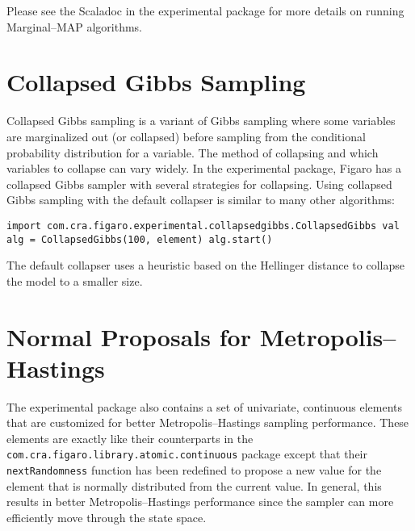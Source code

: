 Please see the Scaladoc in the experimental package for more details on running Marginal--MAP algorithms.

\section{Collapsed Gibbs Sampling}
Collapsed Gibbs sampling is a variant of Gibbs sampling where some variables are marginalized out (or collapsed) before sampling from the conditional probability distribution for a variable. The method of collapsing and which variables to collapse can vary widely. In the experimental package, Figaro has a collapsed Gibbs sampler with several strategies for collapsing. Using collapsed Gibbs sampling with the default collapser is similar to many other algorithms:
\begin{flushleft}
\texttt{import
\newline com.cra.figaro.experimental.collapsedgibbs.CollapsedGibbs
\newline
\newline val alg = CollapsedGibbs(100, element)
\newline alg.start()
}
\end{flushleft}
The default collapser uses a heuristic based on the Hellinger distance
to collapse the model to a smaller size.

\section{Normal Proposals for Metropolis--Hastings}
The experimental package also contains a set of univariate, continuous elements that are customized for better Metropolis--Hastings sampling performance. These elements are exactly like their counterparts in the \texttt{com.cra.figaro.library.atomic.continuous} package except that their \texttt{nextRandomness} function has been redefined to propose a new value for the element that is normally distributed from the current value. In general, this results in better Metropolis--Hastings performance since the sampler can more efficiently move through the state space.